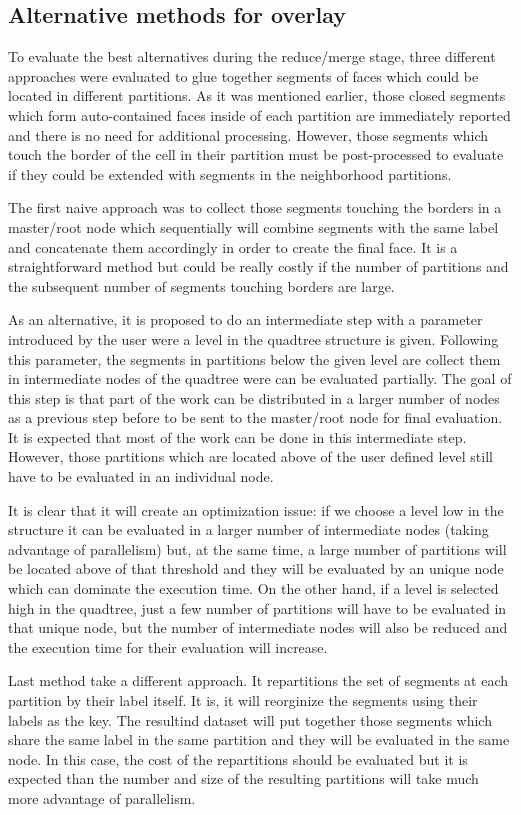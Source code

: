 \subsection{Alternative methods for overlay}\label{sec:alternative_methods}

To evaluate the best alternatives during the reduce/merge stage, three different approaches were evaluated to glue together segments of faces which could be located in different partitions.  As it was mentioned earlier, those closed segments which form auto-contained faces inside of each partition are immediately reported and there is no need for additional processing.  However, those segments which touch the border of the cell in their partition must be post-processed to evaluate if they could be extended with segments in the neighborhood partitions.

The first naive approach was to collect those segments touching the borders in a master/root node which sequentially will combine segments with the same label and concatenate them accordingly in order to create the final face.  It is a straightforward method but could be really costly if the number of partitions and the subsequent number of segments touching borders are large.

As an alternative, it is proposed to do an intermediate step with a parameter introduced by the user were a level in the quadtree structure is given.  Following this parameter, the segments in partitions below the given level are collect them in intermediate nodes of the quadtree were can be evaluated partially.  The goal of this step is that part of the work can be distributed in a larger number of nodes as a previous step before to be sent to the master/root node for final evaluation.  It is expected that most of the work can be done in this intermediate step.  However, those partitions which are located above of the user defined level still have to be evaluated in an individual node.

It is clear that it will create an optimization issue: if we choose a level low in the structure it can be evaluated in a larger number of intermediate nodes (taking advantage of parallelism) but, at the same time, a large number of partitions will be located above of that threshold and they will be evaluated by an unique node which can dominate the execution time.  On the other hand, if a level is selected high in the quadtree, just a few number of partitions will have to be evaluated in that unique node, but the number of intermediate nodes will also be reduced and the execution time for their evaluation will increase.

Last method take a different approach.  It repartitions the set of segments at each partition by their label itself.  It is, it will reorginize the segments using their labels as the key.  The resultind dataset will put together those segments which share the same label in the same partition and they will be evaluated in the same node.  In this case, the cost of the repartitions should be evaluated but it is expected than the number and size of the resulting partitions will take much more advantage of parallelism.
